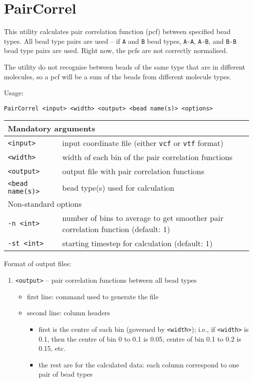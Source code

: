 \section{PairCorrel} \label{sec:PairCorrel}

This utility calculates pair correlation function (pcf) between specified
bead types. All bead type pairs are used -- if \texttt{A} and \texttt{B}
bead types, \texttt{A-A}, \texttt{A-B}, and \texttt{B-B} bead type pairs
are used. Right now, the pcfs are not correctly normalised.

The utility do not recognise between beads of the same type that are in
different molecules, so a pcf will be a sum of the beads from different
molecule types.

Usage:

\vspace{1em}
\noindent
\texttt{PairCorrel <input> <width> <output> <bead name(s)> <options>}

\noindent
\begin{longtable}{p{}p{}}
  \toprule
  \multicolumn{2}{l}{Mandatory arguments} \\
  \midrule
  \texttt{<input>} & input coordinate file (either \texttt{vcf} or
    \texttt{vtf} format) \\
  \texttt{<width>} & width of each bin of the pair correlation functions \\
  \texttt{<output>} & output file with pair correlation functions \\
  \texttt{<bead name(s)>} & bead type(s) used for calculation \\
  \toprule
  \multicolumn{2}{l}{Non-standard options} \\
  \midrule
  \texttt{-n <int>} & number of bins to average to get smoother pair
    correlation function (default: 1) \\
  \texttt{-st <int>} & starting timestep for calculation (default: 1) \\
  \bottomrule
\end{longtable}

\noindent
Format of output files:
\begin{enumerate}[nosep,leftmargin=20pt]
  \item \texttt{<output>} -- pair correlation functions between all bead types
    \begin{itemize}[nosep,leftmargin=5pt]
      \item first line: command used to generate the file
      \item second line: column headers
        \begin{itemize}[nosep,leftmargin=5pt]
          \item first is the centre of each bin (governed by
            \texttt{<width>}); i.e., if \texttt{<width>} is 0.1,
            then the centre of bin 0 to 0.1 is 0.05, centre of bin 0.1 to
            0.2 is 0.15, etc.
          \item the rest are for the calculated data: each column
            correspond to one pair of bead types
        \end{itemize}
    \end{itemize}
\end{enumerate}
